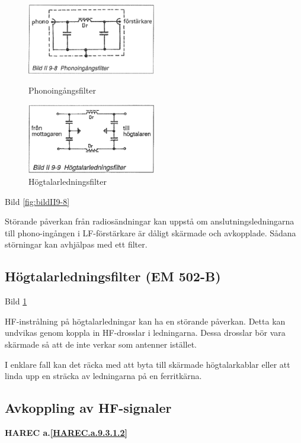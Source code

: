\begin{figure}
  \includegraphics[width=0.5\textwidth]{images/bild_2_9-08}
  \caption{Phonoingångsfilter}
  \label{fig:bildII9-8}
  \includegraphics[width=0.5\textwidth]{images/bild_2_9-09}
  \caption{Högtalarledningsfilter}
  \label{fig:bildII9-9}
\end{figure}

Bild \ref{fig:bildII9-8}

Störande påverkan från radiosändningar kan uppstå om
anslutningsledningarna till phono-ingången i LF-förstärkare är dåligt
skärmade och avkopplade. Sådana störningar kan avhjälpas med ett
filter.

\subsection{Högtalarledningsfilter (EM 502-B)}

Bild \ref{fig:bildII9-9}

HF-instrålning på högtalarledningar kan ha en störande påverkan. Detta
kan undvikas genom koppla in HF-drosslar i ledningarna.  Dessa
drosslar bör vara skärmade så att de inte verkar som antenner
istället.

I enklare fall kan det räcka med att byta till skärmade högtalarkablar
eller att linda upp en sträcka av ledningarna på en ferritkärna.

\subsection{Avkoppling av HF-signaler}
\textbf{
HAREC a.\ref{HAREC.a.9.3.1.2}\label{myHAREC.a.9.3.1.2}
}

